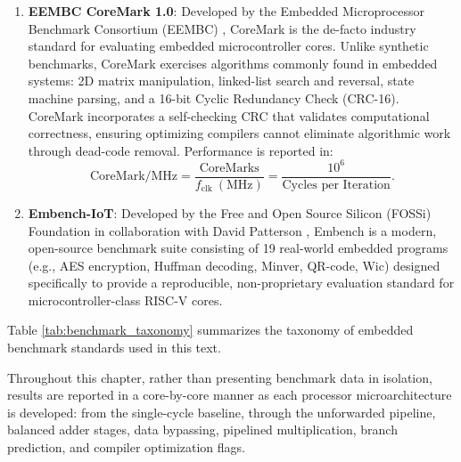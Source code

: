 \begin{enumerate}
    \item \textbf{EEMBC CoreMark 1.0}:
    Developed by the Embedded Microprocessor Benchmark Consortium (EEMBC) \cite{galon2012coremark}, CoreMark is the de-facto industry standard for evaluating embedded microcontroller cores. Unlike synthetic benchmarks, CoreMark exercises algorithms commonly found in embedded systems: 2D matrix manipulation, linked-list search and reversal, state machine parsing, and a 16-bit Cyclic Redundancy Check (CRC-16). CoreMark incorporates a self-checking CRC that validates computational correctness, ensuring optimizing compilers cannot eliminate algorithmic work through dead-code removal. Performance is reported in:
    \begin{equation}
    \text{CoreMark/MHz} = \frac{\text{CoreMarks}}{f_{\text{clk}} \ (\text{MHz})} = \frac{10^6}{\text{Cycles per Iteration}}.
    \end{equation}
    
    \item \textbf{Embench-IoT}:
    Developed by the Free and Open Source Silicon (FOSSi) Foundation in collaboration with David Patterson \cite{embench2020}, Embench is a modern, open-source benchmark suite consisting of 19 real-world embedded programs (e.g., AES encryption, Huffman decoding, Minver, QR-code, Wic) designed specifically to provide a reproducible, non-proprietary evaluation standard for microcontroller-class RISC-V cores.
\end{enumerate}

Table \ref{tab:benchmark_taxonomy} summarizes the taxonomy of embedded benchmark standards used in this text.

\begin{table}[htbp]
\centering
\small
{}
\caption{Taxonomy of embedded computer architecture benchmarks.}\label{tab:benchmark_taxonomy}
\end{table}

Throughout this chapter, rather than presenting benchmark data in isolation, results are reported in a core-by-core manner as each processor microarchitecture is developed: from the single-cycle baseline, through the unforwarded pipeline, balanced adder stages, data bypassing, pipelined multiplication, branch prediction, and compiler optimization flags.